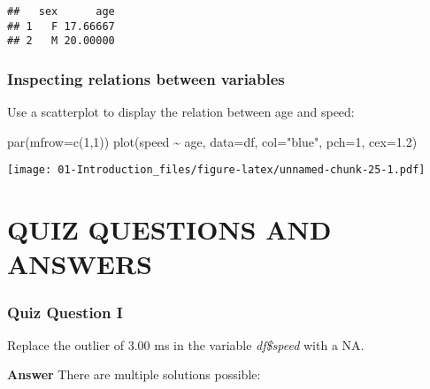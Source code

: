 \documentclass[
]{article}
\newenvironment{Shaded}{\begin{snugshade}}{\end{snugshade}}
\newcommand{\AttributeTok}[1]{\textcolor[rgb]{0.77,0.63,0.00}{#1}}
\newcommand{\ConstantTok}[1]{\textcolor[rgb]{0.00,0.00,0.00}{#1}}
\newcommand{\DecValTok}[1]{\textcolor[rgb]{0.00,0.00,0.81}{#1}}
\newcommand{\FloatTok}[1]{\textcolor[rgb]{0.00,0.00,0.81}{#1}}
\newcommand{\FunctionTok}[1]{\textcolor[rgb]{0.00,0.00,0.00}{#1}}
\newcommand{\NormalTok}[1]{#1}
\newcommand{\OtherTok}[1]{\textcolor[rgb]{0.56,0.35,0.01}{#1}}
\newcommand{\SpecialCharTok}[1]{\textcolor[rgb]{0.00,0.00,0.00}{#1}}
\newcommand{\StringTok}[1]{\textcolor[rgb]{0.31,0.60,0.02}{#1}}
\begin{document}
\begin{verbatim}
##   sex      age
## 1   F 17.66667
## 2   M 20.00000
\end{verbatim}

\hypertarget{inspecting-relations-between-variables}{%
\subsubsection{Inspecting relations between
variables}\label{inspecting-relations-between-variables}}

Use a scatterplot to display the relation between age and speed:

\begin{Shaded}
\begin{Highlighting}[]
\FunctionTok{par}\NormalTok{(}\AttributeTok{mfrow=}\FunctionTok{c}\NormalTok{(}\DecValTok{1}\NormalTok{,}\DecValTok{1}\NormalTok{))}
\FunctionTok{plot}\NormalTok{(speed }\SpecialCharTok{\textasciitilde{}}\NormalTok{ age, }\AttributeTok{data=}\NormalTok{df, }\AttributeTok{col=}\StringTok{"blue"}\NormalTok{, }\AttributeTok{pch=}\DecValTok{1}\NormalTok{, }\AttributeTok{cex=}\FloatTok{1.2}\NormalTok{)}
\end{Highlighting}
\end{Shaded}

\texttt{[image: 01-Introduction\_files/figure-latex/unnamed-chunk-25-1.pdf]}

\hypertarget{quiz-questions-and-answers}{%
\section{\texorpdfstring{{QUIZ QUESTIONS AND
ANSWERS}}{QUIZ QUESTIONS AND ANSWERS}}\label{quiz-questions-and-answers}}

\hypertarget{quiz-question-i}{%
\subsubsection{Quiz Question I}\label{quiz-question-i}}

Replace the outlier of 3.00 ms in the variable \emph{df\$speed} with a
NA.

\textbf{Answer} There are multiple solutions possible:

\begin{Shaded}
\end{Shaded}
\end{document}
